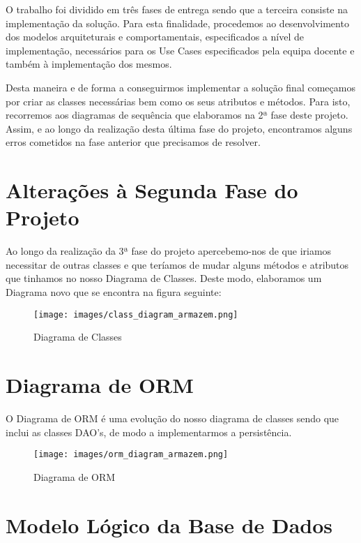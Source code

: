 \documentclass[11pt]{article}
\begin{document}
O trabalho foi dividido em três fases de entrega sendo que a terceira consiste na implementação da solução. Para esta finalidade, procedemos ao desenvolvimento dos modelos arquiteturais e comportamentais, especificados a nível de implementação, necessários para os Use Cases especificados pela equipa docente e também à implementação dos mesmos. 

Desta maneira e de forma a conseguirmos implementar a solução final começamos por criar as classes necessárias bem como os seus atributos e métodos. Para isto, recorremos aos diagramas de sequência que elaboramos na 2ª fase deste projeto. Assim, e ao longo da realização desta última fase do projeto, encontramos alguns erros cometidos na fase anterior que precisamos de resolver.

\clearpage

\section{Alterações à Segunda Fase do Projeto}

Ao longo da realização da 3ª fase do projeto apercebemo-nos de que iriamos necessitar de outras classes e que teríamos de mudar alguns métodos e atributos que tinhamos no nosso Diagrama de Classes. Deste modo, elaboramos um Diagrama novo que se encontra na figura seguinte:

\begin{figure}[htb]
    \centering
    \texttt{[image: images/class\_diagram\_armazem.png]}
    \caption{Diagrama de Classes}
    \label{fig:my_label3}
\end{figure}

\clearpage

\section{Diagrama de ORM}

O Diagrama de ORM é uma evolução do nosso diagrama de classes sendo que inclui as classes DAO's, de modo a implementarmos a persistência.

\begin{figure}[htb]
    \centering
    \texttt{[image: images/orm\_diagram\_armazem.png]}
    \caption{Diagrama de ORM}
    \label{fig:my_label3}
\end{figure}

\clearpage

\section{Modelo Lógico da Base de Dados}
\end{document}

